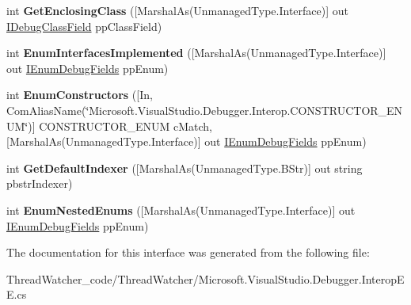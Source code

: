 \begin{DoxyCompactItemize}
\item 
\hypertarget{interface_microsoft_1_1_visual_studio_1_1_debugger_1_1_interop_e_e_1_1_i_debug_class_field_aec5d7649dc3d174b8819c389986912d3}{int {\bfseries Get\+Enclosing\+Class} (\mbox{[}Marshal\+As(Unmanaged\+Type.\+Interface)\mbox{]} out \hyperlink{interface_microsoft_1_1_visual_studio_1_1_debugger_1_1_interop_e_e_1_1_i_debug_class_field}{I\+Debug\+Class\+Field} pp\+Class\+Field)}\label{interface_microsoft_1_1_visual_studio_1_1_debugger_1_1_interop_e_e_1_1_i_debug_class_field_aec5d7649dc3d174b8819c389986912d3}

\item 
\hypertarget{interface_microsoft_1_1_visual_studio_1_1_debugger_1_1_interop_e_e_1_1_i_debug_class_field_ad188e8dc8cfc87253d9b7faf4309bc71}{int {\bfseries Enum\+Interfaces\+Implemented} (\mbox{[}Marshal\+As(Unmanaged\+Type.\+Interface)\mbox{]} out \hyperlink{interface_microsoft_1_1_visual_studio_1_1_debugger_1_1_interop_e_e_1_1_i_enum_debug_fields}{I\+Enum\+Debug\+Fields} pp\+Enum)}\label{interface_microsoft_1_1_visual_studio_1_1_debugger_1_1_interop_e_e_1_1_i_debug_class_field_ad188e8dc8cfc87253d9b7faf4309bc71}

\item 
\hypertarget{interface_microsoft_1_1_visual_studio_1_1_debugger_1_1_interop_e_e_1_1_i_debug_class_field_a67fd1a84cc723a7ee87ab7a57d805e06}{int {\bfseries Enum\+Constructors} (\mbox{[}In, Com\+Alias\+Name(\char`\"{}Microsoft.\+Visual\+Studio.\+Debugger.\+Interop.\+C\+O\+N\+S\+T\+R\+U\+C\+T\+O\+R\+\_\+\+E\+N\+U\+M\char`\"{})\mbox{]} C\+O\+N\+S\+T\+R\+U\+C\+T\+O\+R\+\_\+\+E\+N\+U\+M c\+Match, \mbox{[}Marshal\+As(Unmanaged\+Type.\+Interface)\mbox{]} out \hyperlink{interface_microsoft_1_1_visual_studio_1_1_debugger_1_1_interop_e_e_1_1_i_enum_debug_fields}{I\+Enum\+Debug\+Fields} pp\+Enum)}\label{interface_microsoft_1_1_visual_studio_1_1_debugger_1_1_interop_e_e_1_1_i_debug_class_field_a67fd1a84cc723a7ee87ab7a57d805e06}

\item 
\hypertarget{interface_microsoft_1_1_visual_studio_1_1_debugger_1_1_interop_e_e_1_1_i_debug_class_field_a83d062685d944dfb9fac25d56e3d6907}{int {\bfseries Get\+Default\+Indexer} (\mbox{[}Marshal\+As(Unmanaged\+Type.\+B\+Str)\mbox{]} out string pbstr\+Indexer)}\label{interface_microsoft_1_1_visual_studio_1_1_debugger_1_1_interop_e_e_1_1_i_debug_class_field_a83d062685d944dfb9fac25d56e3d6907}

\item 
\hypertarget{interface_microsoft_1_1_visual_studio_1_1_debugger_1_1_interop_e_e_1_1_i_debug_class_field_acdfcbef00208d3194613e4d1a4c3bbaf}{int {\bfseries Enum\+Nested\+Enums} (\mbox{[}Marshal\+As(Unmanaged\+Type.\+Interface)\mbox{]} out \hyperlink{interface_microsoft_1_1_visual_studio_1_1_debugger_1_1_interop_e_e_1_1_i_enum_debug_fields}{I\+Enum\+Debug\+Fields} pp\+Enum)}\label{interface_microsoft_1_1_visual_studio_1_1_debugger_1_1_interop_e_e_1_1_i_debug_class_field_acdfcbef00208d3194613e4d1a4c3bbaf}

\end{DoxyCompactItemize}


The documentation for this interface was generated from the following file\+:\begin{DoxyCompactItemize}
\item 
Thread\+Watcher\+\_\+code/\+Thread\+Watcher/Microsoft.\+Visual\+Studio.\+Debugger.\+Interop\+E\+E.\+cs\end{DoxyCompactItemize}
